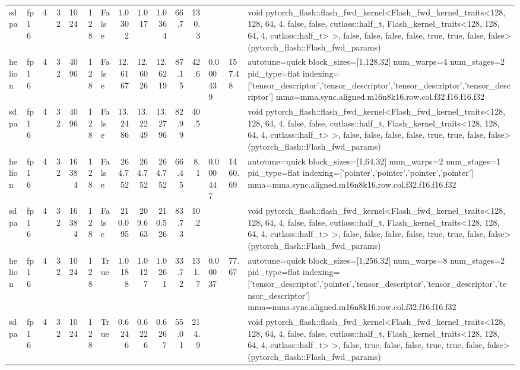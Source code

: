 \begin{table}[htbp]
\begin{tabular}{llrrrrlrrrrrlll}
    sdpa & fp16 & 4 & 32 & 1024 & 128 & False & 1.0302 & 1.017 & 1.0364 & 66.7 & 130.3 &  &  & void pytorch\_flash::flash\_fwd\_kernel<Flash\_fwd\_kernel\_traits<128, 128, 64, 4, false, false, cutlass::half\_t, Flash\_kernel\_traits<128, 128, 64, 4, cutlass::half\_t> >, false, false, false, false, true, true, false, false>(pytorch\_flash::Flash\_fwd\_params) \\
    helion & fp16 & 4 & 32 & 4096 & 128 & False & 12.6167 & 12.6026 & 12.6219 & 87.15 & 42.6 & 0.000439 & 157.48 & autotune=quick block\_sizes=[1,128,32] num\_warps=4 num\_stages=2 pid\_type=flat indexing=['tensor\_descriptor','tensor\_descriptor','tensor\_descriptor','tensor\_descriptor'] mma=mma.sync.aligned.m16n8k16.row.col.f32.f16.f16.f32 \\
    sdpa & fp16 & 4 & 32 & 4096 & 128 & False & 13.2486 & 13.2249 & 13.2796 & 82.99 & 40.5 &  &  & void pytorch\_flash::flash\_fwd\_kernel<Flash\_fwd\_kernel\_traits<128, 128, 64, 4, false, false, cutlass::half\_t, Flash\_kernel\_traits<128, 128, 64, 4, cutlass::half\_t> >, false, false, false, false, true, true, false, false>(pytorch\_flash::Flash\_fwd\_params) \\
    helion & fp16 & 4 & 32 & 16384 & 128 & False & 264.752 & 264.752 & 264.752 & 66.45 & 8.1 & 0.000447 & 1460.69 & autotune=quick block\_sizes=[1,64,32] num\_warps=2 num\_stages=1 pid\_type=flat indexing=['pointer','pointer','pointer','pointer'] mma=mma.sync.aligned.m16n8k16.row.col.f32.f16.f16.f32 \\
    sdpa & fp16 & 4 & 32 & 16384 & 128 & False & 210.095 & 209.663 & 210.526 & 83.73 & 10.2 &  &  & void pytorch\_flash::flash\_fwd\_kernel<Flash\_fwd\_kernel\_traits<128, 128, 64, 4, false, false, cutlass::half\_t, Flash\_kernel\_traits<128, 128, 64, 4, cutlass::half\_t> >, false, false, false, false, true, true, false, false>(pytorch\_flash::Flash\_fwd\_params) \\
    helion & fp16 & 4 & 32 & 1024 & 128 & True & 1.0188 & 1.0127 & 1.0261 & 33.72 & 131.7 & 0.00037 & 77.67 & autotune=quick block\_sizes=[1,256,32] num\_warps=8 num\_stages=2 pid\_type=flat indexing=['tensor\_descriptor','pointer','tensor\_descriptor','tensor\_descriptor','tensor\_descriptor'] mma=mma.sync.aligned.m16n8k16.row.col.f32.f16.f16.f32 \\
    sdpa & fp16 & 4 & 32 & 1024 & 128 & True & 0.6246 & 0.6226 & 0.6267 & 55.01 & 214.9 &  &  & void pytorch\_flash::flash\_fwd\_kernel<Flash\_fwd\_kernel\_traits<128, 128, 64, 4, false, false, cutlass::half\_t, Flash\_kernel\_traits<128, 128, 64, 4, cutlass::half\_t> >, false, true, false, false, true, true, false, false>(pytorch\_flash::Flash\_fwd\_params) \\

\end{tabular}
\end{table}
